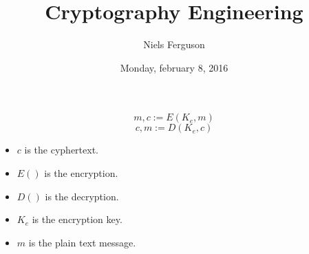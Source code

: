 \documentclass{article}
\title{Cryptography Engineering}
\author{Niels Ferguson}
\date{Monday, february 8, 2016}
\begin{document}
\begin{equation}
m,c:=E(K_e,m)
\end{equation}
\begin{equation}
c,m:=D(K_e,c)
\end{equation}
\begin{itemize}
\item $c$ is the cyphertext.
\item $E()$ is the encryption.
\item $D()$ is the decryption.
\item $K_e$ is the encryption key.
\item $m$ is the plain text message.
\end{itemize}
\end{document}
